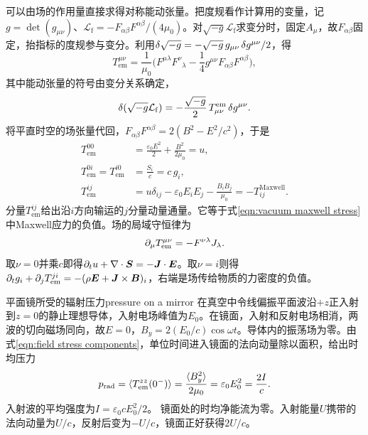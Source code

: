 可以由场的作用量直接求得对称能动张量。把度规看作计算用的变量，记$g = \det(g_{\mu\nu})$、$\mathcal L_\mathrm{f} = -F_{\alpha\beta}F^{\alpha\beta}/(4\mu_0)$。对$\sqrt{-g}\mathcal L_\mathrm{f}$求变分时，固定$A_\mu$，故$F_{\alpha\beta}$固定，抬指标的度规参与变分。利用$\mathop{}\!\delta\sqrt{-g} = -\sqrt{-g}\,g_{\mu\nu}\mathop{}\!\delta g^{\mu\nu}/2$，得
\begin{equation}
    T^{\mu\nu}_\mathrm{em}
    = \frac{1}{\mu_0}\biggl(F^{\mu\lambda}F^\nu{}_\lambda
       - \frac14 g^{\mu\nu}F_{\alpha\beta}F^{\alpha\beta}\biggr),
    \label{eqn:field stress energy}
\end{equation}
其中能动张量的符号由变分关系确定，
\begin{equation}
    \label{eq:ed-metric-stress-definition}
    \mathop{}\!\delta(\sqrt{-g}\mathcal L_\mathrm{f})
      = -\frac{\sqrt{-g}}{2}\,T_{\mu\nu}^\mathrm{em}\mathop{}\!\delta g^{\mu\nu}.
\end{equation}
将平直时空的场张量代回，$F_{\alpha\beta}F^{\alpha\beta} = 2(B^2 - E^2/c^2)$，于是
\begin{subequations}\label{eqn:field stress components}
    \begin{align}
        T^{00}_\mathrm{em} &= \frac{\varepsilon_0 E^2}{2} + \frac{B^2}{2\mu_0} = u,\\
        T^{0i}_\mathrm{em} = T^{i0}_\mathrm{em} &= \frac{S_i}{c} = c\,g_i,\\
        T^{ij}_\mathrm{em} &= u\delta_{ij} - \varepsilon_0 E_iE_j - \frac{B_iB_j}{\mu_0} = -T_{ij}^{\mathrm{Maxwell}}.
    \end{align}
\end{subequations}
分量$T^{ij}_\mathrm{em}$给出沿$i$方向输运的$j$分量动量通量。它等于式\eqref{eqn:vacuum maxwell stress}中Maxwell应力的负值。场的局域守恒律为
\begin{equation}
    \label{eq:ed-covariant-stress-balance}
    \partial_\mu T^{\mu\nu}_\mathrm{em} = -F^{\nu\lambda}J_\lambda .
\end{equation}
取$\nu = 0$并乘$c$即得$\partial_t u + \nabla\cdot\bm S = -\bm J \cdot \bm E$。取$\nu = i$则得$\partial_t g_i + \partial_j T^{ji}_\mathrm{em} = -(\rho\bm E + \bm J \times \bm B)_i$，右端是场传给物质的力密度的负值。

\begin{example}{平面镜所受的辐射压力}{pressure on a mirror}
    在真空中令线偏振平面波沿$+z$正入射到$z = 0$的静止理想导体，入射电场峰值为$E_0$。在镜面，入射和反射电场相消，两波的切向磁场同向，故$E = 0$，$B_y = 2(E_0/c)\cos\omega t$。导体内的振荡场为零。由式\eqref{eqn:field stress components}，单位时间进入镜面的法向动量除以面积，给出时均压力
    \begin{equation}
        \label{eq:ed-perfectly-reflecting-radiation-pressure}
        p_\mathrm{rad} = \langle T^{zz}_\mathrm{em}(0^-)\rangle
         = \frac{\langle B_y^2\rangle}{2\mu_0}
         = \varepsilon_0 E_0^2 = \frac{2I}{c}.
    \end{equation}
    入射波的平均强度为$I = \varepsilon_0 c E_0^2/2$。
    镜面处的时均净能流为零。入射能量$U$携带的法向动量为$U/c$，反射后变为$-U/c$，镜面正好获得$2U/c$。
\end{example}
